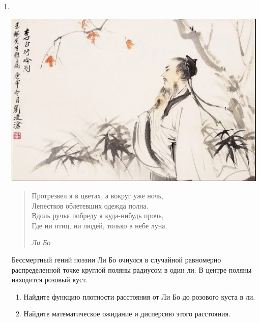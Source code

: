 \documentclass[12pt]{article} %
\begin{document}
\begin{enumerate}
    \item $ $ \\ %
 \vspace{\baselineskip}
 \begin{minipage}{\linewidth}
 \includegraphics[width=17cm]{libo.png}
 \end{minipage}

 \begin{minipage}{12cm}
 \begin{quote}
    Протрезвел я в цветах, а вокруг уже ночь, \\
    Лепестков облетевших одежда полна. \\
    Вдоль ручья побреду я куда-нибудь прочь, \\
    Где ни птиц, ни людей, только в небе луна. 
    
    \hspace{7cm} \textit{Ли Бо}
    
  \end{quote}
\end{minipage} 
 
\vspace{0.3cm}

    Бессмертный гений поэзии Ли Бо очнулся в случайной равномерно распределенной точке круглой поляны радиусом в один ли. 
    В центре поляны находится розовый куст. 
    \begin{enumerate}
        \item Найдите функцию плотности расстояния от Ли Бо до розового куста в ли. 
        \item Найдите математическое ожидание и дисперсию этого расстояния.
    \end{enumerate}


\end{enumerate}
\end{document}
